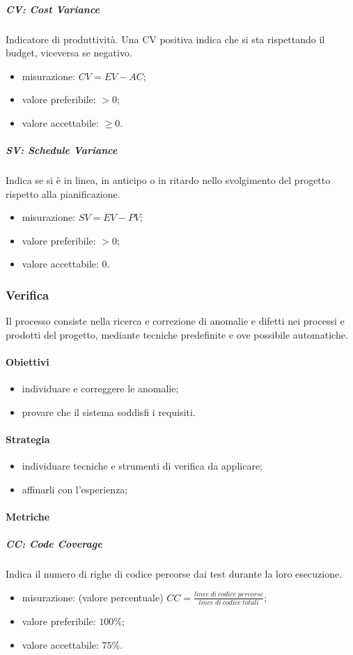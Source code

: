 		\subparagraph{CV: Cost Variance}
			Indicatore di produttività. Una CV positiva indica che si sta rispettando il budget, viceversa se negativo.
			\begin{itemize}
				\item misurazione: $CV = EV - AC$;
				\item valore preferibile: $ > 0$;
				\item valore accettabile: $ \geq 0$.
			\end{itemize}
		\subparagraph{SV: Schedule Variance}
			Indica se si è in linea, in anticipo o in ritardo nello svolgimento del progetto rispetto alla pianificazione.
			\begin{itemize}
				\item misurazione: $SV = EV - PV$;
				\item valore preferibile: $ > 0$;
				\item valore accettabile: 0.
			\end{itemize}
			
	\subsubsection{Verifica}
	Il processo consiste nella ricerca e correzione di anomalie e difetti nei processi e prodotti del progetto, mediante tecniche predefinite e ove possibile automatiche.
		\paragraph{Obiettivi}
		\begin{itemize}
			\item individuare e correggere le anomalie;
			\item provare che il sistema soddisfi i requisiti.
		\end{itemize}	
		\paragraph{Strategia}
		\begin{itemize}
			\item individuare tecniche e strumenti di verifica da applicare;
			\item affinarli con l'esperienza;
		\end{itemize}	
		\paragraph{Metriche}
			\subparagraph{CC: Code Coverage}
				Indica il numero di righe di codice percorse dai test durante la loro esecuzione. 
				\begin{itemize}
					\item misurazione: (valore percentuale) $CC = \frac{linee\ di\ codice\ percorse}{linee\ di\ codice\ totali}$;
					\item valore preferibile: $100\%$;
					\item valore accettabile: $75\%$.
				\end{itemize}

